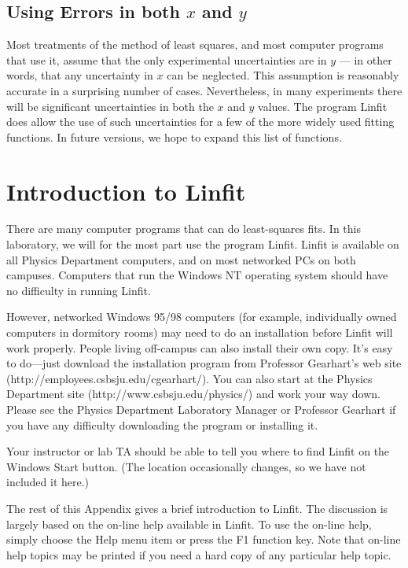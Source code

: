 \subsection*{Using Errors in both $x$ and $y$}

Most treatments of the method of least squares, and most computer
programs that use it, assume that the only experimental uncertainties
are in $y$ --- in other words, that any uncertainty in $x$ can be
neglected.  This assumption is reasonably accurate in a surprising
number of cases.  Nevertheless, in many experiments there will be
significant uncertainties in both the $x$ and $y$ values.  The program
Linfit does allow the use of such uncertainties for a few of the more
widely used fitting functions.  In future versions, we hope to expand
this list of functions.



\newpage
\section*{Introduction to Linfit}

There are many computer programs that can do least-squares fits.  In
this laboratory, we will for the most part use the program Linfit.
Linfit is available on all Physics Department computers, and on most
networked PCs on both campuses.  Computers that run the Windows NT
operating system should have no difficulty in running Linfit.

However, networked Windows 95/98 computers (for example, individually
owned computers in dormitory rooms) may need to do an installation
before Linfit will work properly.  People living off-campus can
also install their own copy.  It's easy to do---just download  
the installation program from Professor Gearhart's web site (http://employees.csbsju.edu/cgearhart/).  You can also start at the
Physics Department site (http://www.csbsju.edu/physics/) and work your
way down.  Please see the Physics Department
Laboratory Manager or Professor Gearhart if you have any difficulty
downloading the program or installing it.

Your instructor or lab TA should be able to tell you where to find
Linfit on the Windows Start button.  (The location occasionally
changes, so we have not included it here.)

The rest of this Appendix gives a brief introduction to Linfit.  The
discussion is largely based
on the on-line help available in Linfit.  To use the
on-line help, simply choose the Help menu item or press the F1
function key.  Note that on-line help topics may be printed if you
need a hard copy of any particular help topic.

